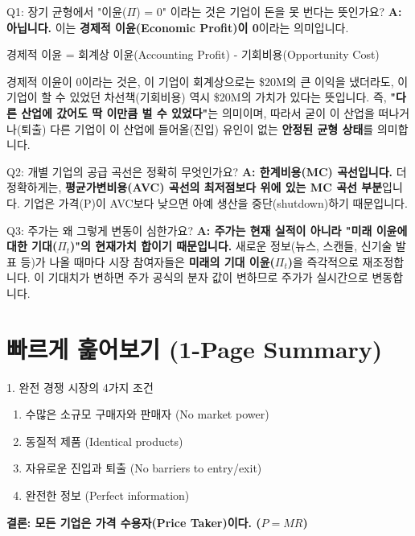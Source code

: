 \documentclass[11pt,a4paper]{article}
\theoremstyle{definition}
\begin{document}
\begin{tcolorbox}{Q1: 장기 균형에서 "이윤($\Pi$) = 0" 이라는 것은 기업이 돈을 못 번다는 뜻인가요?}
\textbf{A: 아닙니다.} 이는 \textbf{경제적 이윤(Economic Profit)이 0}이라는 의미입니다.

경제적 이윤 = 회계상 이윤(Accounting Profit) - 기회비용(Opportunity Cost)

경제적 이윤이 0이라는 것은, 이 기업이 회계상으로는 \$20M의 큰 이익을 냈더라도, 이 기업이 할 수 있었던 차선책(기회비용) 역시 \$20M의 가치가 있다는 뜻입니다.
즉, \textbf{"다른 산업에 갔어도 딱 이만큼 벌 수 있었다"}는 의미이며, 따라서 굳이 이 산업을 떠나거나(퇴출) 다른 기업이 이 산업에 들어올(진입) 유인이 없는 \textbf{안정된 균형 상태}를 의미합니다.
\end{tcolorbox}

\begin{tcolorbox}{Q2: 개별 기업의 공급 곡선은 정확히 무엇인가요?}
\textbf{A: 한계비용(MC) 곡선입니다.}
더 정확하게는, \textbf{평균가변비용(AVC) 곡선의 최저점보다 위에 있는 MC 곡선 부분}입니다.
기업은 가격(P)이 AVC보다 낮으면 아예 생산을 중단(shutdown)하기 때문입니다.
\end{tcolorbox}

\begin{tcolorbox}{Q3: 주가는 왜 그렇게 변동이 심한가요?}
\textbf{A: 주가는 현재 실적이 아니라 "미래 이윤에 대한 기대($\Pi_t$)"의 현재가치 합이기 때문입니다.}
새로운 정보(뉴스, 스캔들, 신기술 발표 등)가 나올 때마다 시장 참여자들은 \textbf{미래의 기대 이윤($\Pi_t$)}을 즉각적으로 재조정합니다. 이 기대치가 변하면 주가 공식의 분자 값이 변하므로 주가가 실시간으로 변동합니다.
\end{tcolorbox}

\newpage
\section{빠르게 훑어보기 (1-Page Summary)}

\begin{mybox}{1. 완전 경쟁 시장의 4가지 조건}
\begin{enumerate}
    \item 수많은 소규모 구매자와 판매자 (No market power)
    \item 동질적 제품 (Identical products)
    \item 자유로운 진입과 퇴출 (No barriers to entry/exit)
    \item 완전한 정보 (Perfect information)
\end{enumerate}
\textbf{결론: 모든 기업은 가격 수용자(Price Taker)이다. ($P = MR$)}
\end{mybox}
\end{document}
